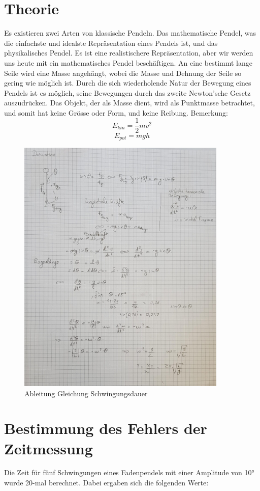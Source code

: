 \documentclass[12pt, a4paper, twoside]{article}
\begin{document}
    \section{Theorie}
    Es existieren zwei Arten von klassische Pendeln. Das mathematische Pendel, was die einfachste und idealste Repräsentation eines Pendels ist, und das physikalisches Pendel. Es ist eine realistischere  Repräsentation, aber wir werden uns heute mit ein mathematisches Pendel beschäftigen. An eine bestimmt lange Seile wird eine Masse angehängt, wobei die Masse und Dehnung der Seile so gering wie möglich ist. 
    Durch die sich wiederholende Natur der Bewegung eines Pendels ist es möglich, seine Bewegungen durch das zweite Newton’sche Gesetz auszudrücken. 
    Das Objekt, der als Masse dient, wird als Punktmasse betrachtet, und somit hat keine Grösse oder Form, und keine Reibung.
    Bemerkung:\\
    \[E_{kin}=\frac{1}{2}mv^{2}\] 
    \[E_{pot}=mgh\]
    \begin{figure}[h!]
        \begin{center}
            \includegraphics[scale=0.25, width=10cm]{Theorie.jpeg}
            \caption{Ableitung Gleichung Schwingungsdauer}
        \end{center}
    \end{figure}
    \newpage
    \section{Bestimmung des Fehlers der Zeitmessung}
    Die Zeit für fünf Schwingungen eines Fadenpendels mit einer Amplitude von 10° wurde 20-mal berechnet. Dabei ergaben sich die folgenden Werte:
    \\
    
\end{document}
